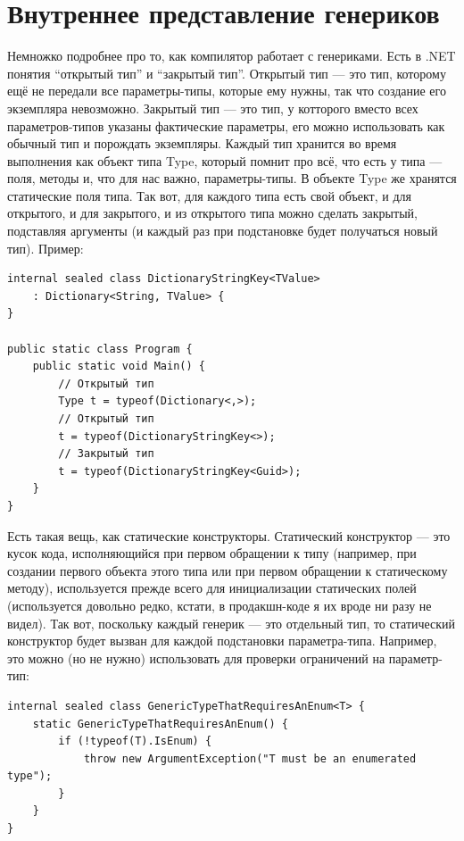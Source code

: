 \documentclass[a5paper]{article}
\begin{document}
\section{Внутреннее представление генериков}

Немножко подробнее про то, как компилятор работает с генериками. Есть в .NET понятия ``открытый тип'' и ``закрытый тип''. Открытый тип --- это тип, которому ещё не передали все параметры-типы, которые ему нужны, так что создание его экземпляра невозможно. Закрытый тип --- это тип, у котторого вместо всех параметров-типов указаны фактические параметры, его можно использовать как обычный тип и порождать экземпляры. Каждый тип хранится во время выполнения как объект типа Type, который помнит про всё, что есть у типа --- поля, методы и, что для нас важно, параметры-типы. В объекте Type же хранятся статические поля типа. Так вот, для каждого типа есть свой объект, и для открытого, и для закрытого, и из открытого типа можно сделать закрытый, подставляя аргументы (и каждый раз при подстановке будет получаться новый тип). Пример:

\begin{verbatim}
internal sealed class DictionaryStringKey<TValue>
    : Dictionary<String, TValue> {
}

public static class Program {
    public static void Main() {
        // Открытый тип
        Type t = typeof(Dictionary<,>);
        // Открытый тип
        t = typeof(DictionaryStringKey<>);
        // Закрытый тип
        t = typeof(DictionaryStringKey<Guid>);
    }
}
\end{verbatim}

Есть такая вещь, как статические конструкторы. Статический конструктор --- это кусок кода, исполняющийся при первом обращении к типу (например, при создании первого объекта этого типа или при первом обращении к статическому методу), используется прежде всего для инициализации статических полей (используется довольно редко, кстати, в продакшн-коде я их вроде ни разу не видел). Так вот, поскольку каждый генерик --- это отдельный тип, то статический конструктор будет вызван для каждой подстановки параметра-типа. Например, это можно (но не нужно) использовать для проверки ограничений на параметр-тип:

\begin{verbatim}
internal sealed class GenericTypeThatRequiresAnEnum<T> {
    static GenericTypeThatRequiresAnEnum() {
        if (!typeof(T).IsEnum) {
            throw new ArgumentException("T must be an enumerated type");
        }
    }
}
\end{verbatim}
\end{document}
